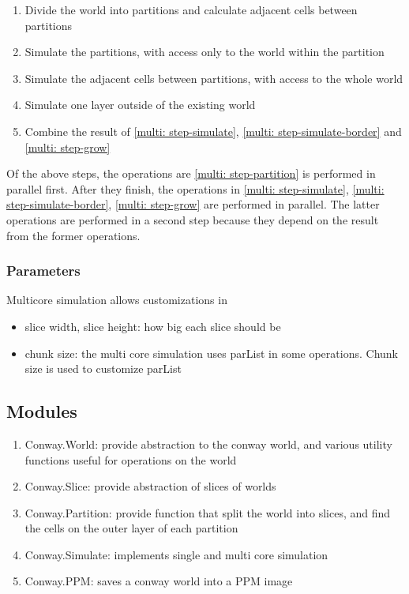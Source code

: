 \documentclass{article}
\newcommand{\code}[1]{{\ttfamily #1}}
\begin{document}
      \begin{enumerate}
        \item \label{multi: step-partition}
        Divide the world into partitions and calculate adjacent cells
        between partitions
        \item \label{multi: step-simulate}
        Simulate the partitions, with access only to the world within the
        partition
        \item \label{multi: step-simulate-border}
        Simulate the adjacent cells between partitions, with access to the
        whole world
        \item \label{multi: step-grow}
        Simulate one layer outside of the existing world
        \item Combine the result of \ref{multi: step-simulate},
        \ref{multi: step-simulate-border} and \ref{multi: step-grow}
      \end{enumerate}

      Of the above steps, the operations are \ref{multi: step-partition}
      is performed in parallel first. After they finish, the operations in
      \ref{multi: step-simulate}, \ref{multi: step-simulate-border},
      \ref{multi: step-grow} are performed in parallel. The latter operations
      are performed in a second step because they depend on the result from
      the former operations.

      \subsubsection{Parameters}

        Multicore simulation allows customizations in

        \begin{itemize}
          \item slice width, slice height: how big each slice should be
          \item chunk size: the multi core simulation uses \code{parList} in
          some operations. Chunk size is used to customize \code{parList}
        \end{itemize}

    \subsection{Modules}

      \begin{enumerate}
        \item \code{Conway.World}: provide abstraction to the conway world,
        and various utility functions useful for operations on the world
        \item \code{Conway.Slice}: provide abstraction of slices of worlds
        \item \code{Conway.Partition}: provide function that split the world
        into slices, and find the cells on the outer layer of each partition
        \item \code{Conway.Simulate}: implements single and multi core
        simulation
        \item \code{Conway.PPM}: saves a conway world into a PPM image
      \end{enumerate}
\end{document}
